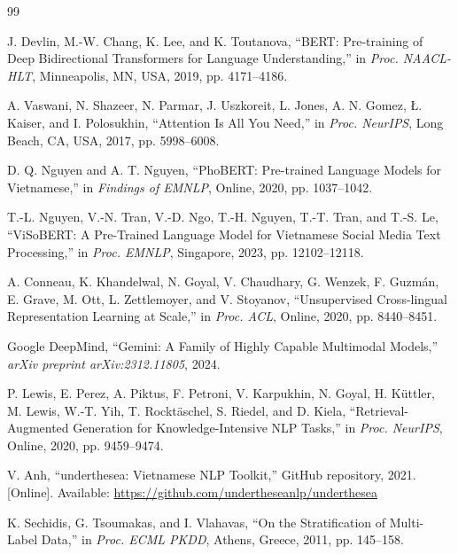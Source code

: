 \documentclass[12pt, a4paper]{report}
\begin{document}
\begin{thebibliography}{99}

J. Devlin, M.-W. Chang, K. Lee, and K. Toutanova,
``BERT: Pre-training of Deep Bidirectional Transformers for Language Understanding,''
in \textit{Proc. NAACL-HLT}, Minneapolis, MN, USA, 2019, pp. 4171--4186.

A. Vaswani, N. Shazeer, N. Parmar, J. Uszkoreit, L. Jones, A. N. Gomez,
\L. Kaiser, and I. Polosukhin,
``Attention Is All You Need,''
in \textit{Proc. NeurIPS}, Long Beach, CA, USA, 2017, pp. 5998--6008.

D. Q. Nguyen and A. T. Nguyen,
``PhoBERT: Pre-trained Language Models for Vietnamese,''
in \textit{Findings of EMNLP}, Online, 2020, pp. 1037--1042.

T.-L. Nguyen, V.-N. Tran, V.-D. Ngo, T.-H. Nguyen, T.-T. Tran, and T.-S. Le,
``ViSoBERT: A Pre-Trained Language Model for Vietnamese Social Media Text Processing,''
in \textit{Proc. EMNLP}, Singapore, 2023, pp. 12102--12118.

A. Conneau, K. Khandelwal, N. Goyal, V. Chaudhary, G. Wenzek, F. Guzm\'{a}n,
E. Grave, M. Ott, L. Zettlemoyer, and V. Stoyanov,
``Unsupervised Cross-lingual Representation Learning at Scale,''
in \textit{Proc. ACL}, Online, 2020, pp. 8440--8451.

Google DeepMind,
``Gemini: A Family of Highly Capable Multimodal Models,''
\textit{arXiv preprint arXiv:2312.11805}, 2024.

P. Lewis, E. Perez, A. Piktus, F. Petroni, V. Karpukhin, N. Goyal,
H. K\"{u}ttler, M. Lewis, W.-T. Yih, T. Rockt\"{a}schel, S. Riedel, and D. Kiela,
``Retrieval-Augmented Generation for Knowledge-Intensive NLP Tasks,''
in \textit{Proc. NeurIPS}, Online, 2020, pp. 9459--9474.

V. Anh,
``underthesea: Vietnamese NLP Toolkit,''
GitHub repository, 2021.
[Online]. Available: \url{https://github.com/undertheseanlp/underthesea}

K. Sechidis, G. Tsoumakas, and I. Vlahavas,
``On the Stratification of Multi-Label Data,''
in \textit{Proc. ECML PKDD}, Athens, Greece, 2011, pp. 145--158.


\end{thebibliography}
\end{document}
